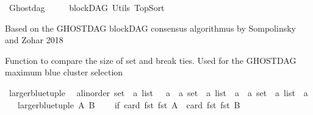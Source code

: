 %
\begin{isabellebody}%
%
%
\isadelimtheory
\isanewline
%
\endisadelimtheory
%
\isatagtheory
{}\isamarkupfalse%
\ Ghostdag\ \ \isanewline
\ \ \ blockDAG\ Utils\ TopSort\isanewline
{}%
\endisatagtheory
{\isafoldtheory}%
%
\isadelimtheory
%
\endisadelimtheory
%
\isadelimdocument
%
\endisadelimdocument
%
\isatagdocument
%
\isamarkuptrue%
%
\endisatagdocument
{\isafolddocument}%
%
\isadelimdocument
%
\endisadelimdocument
%
\begin{isamarkuptext}%
Based on the GHOSTDAG blockDAG consensus algorithmus by Sompolinsky and Zohar 2018%
\end{isamarkuptext}\isamarkuptrue%
%
\isadelimdocument
%
\endisadelimdocument
%
\isatagdocument
%
\isamarkuptrue%
%
\endisatagdocument
{\isafolddocument}%
%
\isadelimdocument
%
\endisadelimdocument
%
\begin{isamarkuptext}%
Function to compare the size of set and break ties. Used for the GHOSTDAG maximum blue 
      cluster selection%
\end{isamarkuptext}\isamarkuptrue%
\isamarkupfalse%
\ larger{\isacharunderscore}{\kern0pt}blue{\isacharunderscore}{\kern0pt}tuple\ {\isacharcolon}{\kern0pt}{\isacharcolon}{\kern0pt}\isanewline
\ {\isachardoublequoteopen}{\isacharparenleft}{\kern0pt}{\isacharparenleft}{\kern0pt}{\isacharprime}{\kern0pt}a{\isacharcolon}{\kern0pt}{\isacharcolon}{\kern0pt}linorder\ set\ {\isasymtimes}\ {\isacharprime}{\kern0pt}a\ list{\isacharparenright}{\kern0pt}\ \ {\isasymtimes}\ {\isacharprime}{\kern0pt}a{\isacharparenright}{\kern0pt}\ {\isasymRightarrow}\ {\isacharparenleft}{\kern0pt}{\isacharparenleft}{\kern0pt}{\isacharprime}{\kern0pt}a\ set\ {\isasymtimes}\ {\isacharprime}{\kern0pt}a\ list{\isacharparenright}{\kern0pt}\ {\isasymtimes}\ {\isacharprime}{\kern0pt}a{\isacharparenright}{\kern0pt}\ {\isasymRightarrow}\ {\isacharparenleft}{\kern0pt}{\isacharparenleft}{\kern0pt}{\isacharprime}{\kern0pt}a\ set\ {\isasymtimes}\ {\isacharprime}{\kern0pt}a\ list{\isacharparenright}{\kern0pt}\ {\isasymtimes}\ {\isacharprime}{\kern0pt}a{\isacharparenright}{\kern0pt}{\isachardoublequoteclose}\isanewline
\ \ \ {\isachardoublequoteopen}larger{\isacharunderscore}{\kern0pt}blue{\isacharunderscore}{\kern0pt}tuple\ A\ B\ {\isacharequal}{\kern0pt}\ \isanewline
\ \ {\isacharparenleft}{\kern0pt}if\ {\isacharparenleft}{\kern0pt}card\ {\isacharparenleft}{\kern0pt}fst\ {\isacharparenleft}{\kern0pt}fst\ A{\isacharparenright}{\kern0pt}{\isacharparenright}{\kern0pt}{\isacharparenright}{\kern0pt}\ {\isachargreater}{\kern0pt}\ {\isacharparenleft}{\kern0pt}card\ {\isacharparenleft}{\kern0pt}fst\ {\isacharparenleft}{\kern0pt}fst\ B{\isacharparenright}{\kern0pt}{\isacharparenright}{\kern0pt}{\isacharparenright}{\kern0pt}\ {\isasymor}\ \isanewline

\end{isabellebody}
